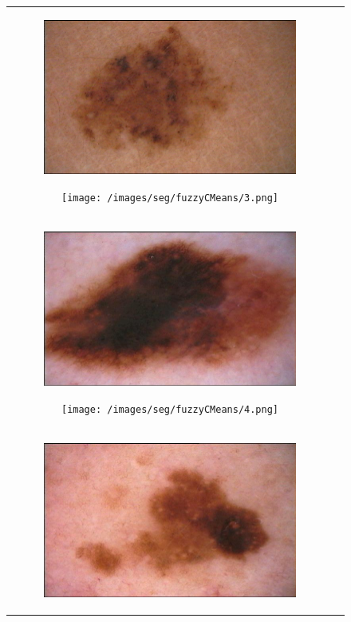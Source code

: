 \documentclass[a4paper, 10pt, conference]{ieeeconf}        %
\begin{document}
\begin{figure}[ht!]
\begin{tabular}{c c}
\begin{subfigure}{0.2\textwidth}
  \includegraphics[scale=0.15]{original03.JPG}\caption{}
  \end{subfigure}
  \begin{subfigure}{0.2\textwidth}
  \texttt{[image: /images/seg/fuzzyCMeans/3.png]}\caption{}
  \end{subfigure}\\
 \begin{subfigure}{0.2\textwidth}
  \includegraphics[scale=0.15]{original04.JPG}\caption{}
  \end{subfigure}
  \begin{subfigure}{0.2\textwidth}
  \texttt{[image: /images/seg/fuzzyCMeans/4.png]}\caption{}
  \end{subfigure}\\
 \begin{subfigure}{0.2\textwidth}
 \includegraphics[scale=0.15]{original05.JPG}\caption{}

\end{subfigure}
\end{tabular}
\end{figure}
\end{document}
